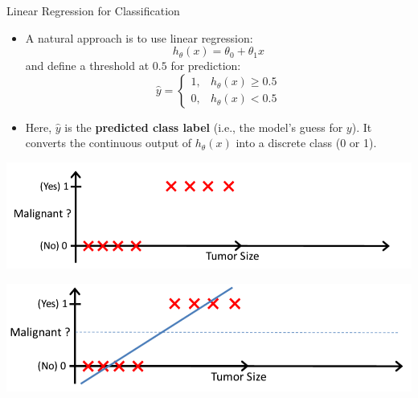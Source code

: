 \documentclass[serif, aspectratio=169]{beamer}
\begin{document}
\begin{frame}{Linear Regression for Classification}
    \begin{itemize}
        \item A natural approach is to use linear regression:
        \[
            h_\theta(x) = \theta_0 + \theta_1 x
        \]
        and define a threshold at $0.5$ for prediction:
        \[
            \hat{y} =
            \begin{cases}
                1, & h_\theta(x) \ge 0.5\\
                0, & h_\theta(x) < 0.5
            \end{cases}
        \]
    \item Here, $\hat{y}$ is the \textbf{predicted class label} (i.e., the model's guess for $y$). It converts the continuous output of $h_\theta(x)$ into a discrete class (0 or 1).
    \end{itemize}

    \vspace{0.5em}
    \begin{minipage}{0.48\linewidth}
        \centering
        \includegraphics[width=\linewidth]{pic/lrClassification1.png}
    \end{minipage}
    \hfill
    \begin{minipage}{0.48\linewidth}
        \centering
        \includegraphics[width=\linewidth]{pic/lrClassification3.png}
    \end{minipage}
\end{frame}
\end{document}
